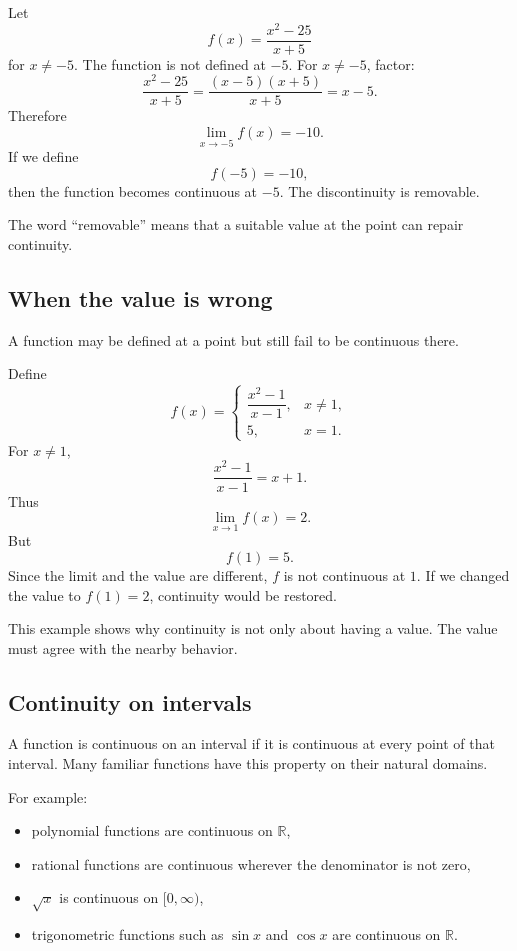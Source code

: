 \begin{examplebox}
Let
\[
f(x)=\frac{x^2-25}{x+5}
\]
for \(x\ne -5\). The function is not defined at \(-5\). For \(x\ne -5\), factor:
\[
\frac{x^2-25}{x+5}=\frac{(x-5)(x+5)}{x+5}=x-5.
\]
Therefore
\[
\lim_{x\to -5}f(x)=-10.
\]
If we define
\[
f(-5)=-10,
\]
then the function becomes continuous at \(-5\). The discontinuity is removable.
\end{examplebox}

The word ``removable'' means that a suitable value at the point can repair continuity.

\subsection*{When the value is wrong}

A function may be defined at a point but still fail to be continuous there.

\begin{examplebox}
Define
\[
f(x)=
\begin{cases}
\dfrac{x^2-1}{x-1}, & x\ne1,\\
5, & x=1.
\end{cases}
\]
For \(x\ne1\),
\[
\frac{x^2-1}{x-1}=x+1.
\]
Thus
\[
\lim_{x\to1}f(x)=2.
\]
But
\[
f(1)=5.
\]
Since the limit and the value are different, \(f\) is not continuous at \(1\). If we changed the value to \(f(1)=2\), continuity would be restored.
\end{examplebox}

This example shows why continuity is not only about having a value. The value must agree with the nearby behavior.

\subsection*{Continuity on intervals}

A function is continuous on an interval if it is continuous at every point of that interval. Many familiar functions have this property on their natural domains.

For example:
\begin{itemize}
\item polynomial functions are continuous on \(\mathbb{R}\),
\item rational functions are continuous wherever the denominator is not zero,
\item \(\sqrt{x}\) is continuous on \([0,\infty)\),
\item trigonometric functions such as \(\sin x\) and \(\cos x\) are continuous on \(\mathbb{R}\).
\end{itemize}

